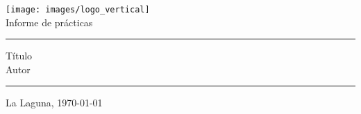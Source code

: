 \documentclass[spanish,a4paper,11pt,oneside]{extreport}
\begin{document}

\pagestyle{empty}
\thispagestyle{empty}

\newcommand{\HRule}{\rule{\linewidth}{1mm}}
\setlength{\parindent}{0mm}
\setlength{\parskip}{0mm}


\begin{center}
  \texttt{[image: images/logo\_vertical]}\\[10mm]
  {\Huge Informe de prácticas}
\end{center}

\HRule
\begin{flushright}
  {\Huge Título} \\[2.5mm]
  {\Large Autor} \\[5mm]

\end{flushright}
\HRule
{}
\begin{center}
  \Large La Laguna, \today
\end{center}

\setlength{\parindent}{5mm}

\newpage{\pagestyle{empty}}
\thispagestyle{empty}

\pagestyle{myheadings} %

\renewcommand{\thepage}{\roman{page}}
\setcounter{page}{1}


\tableofcontents

\newpage{\pagestyle{empty}}
\end{document}
